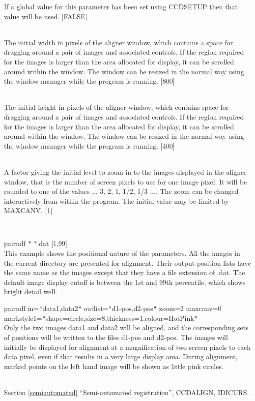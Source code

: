 \documentclass[twoside,11pt]{article}
\newcommand{\htmlref}[2]{#1}
\newcommand{\latexhtml}[2]{#1}
\renewcommand{\_}{\texttt{\symbol{95}}}
\newcommand{\xroutine}[1]{\htmlref{{\sc #1}}{#1}}
\newcommand{\secref}[2]{\latexhtml{Section \ref{#1} ``#2''}{``\htmlref{#2}{#1}''}}
\newcommand{\sstexamples}[1]{
   \item[Examples:] \mbox{} \\
   \vspace{-3.5ex}
   \begin{description}
      #1
   \end{description}
}
\newcommand{\sstsubsection}[1]{ \item[{#1}] \mbox{} \\}
\newcommand{\sstexamplesubsection}[2]{\sloppy \item{\ssttt #1} \mbox{} \\ #2 }
\newcommand{\sstnotes}[1]{\item[Notes:] \mbox{} \\[1.3ex] #1}
\newcommand{\sstdiytopic}[2]{\item[#1:] \mbox{} \\[1.3ex] #2}
\newcommand{\sstitemlist}[1]{
  \mbox{} \\
  \vspace{-3.5ex}
  \begin{itemize}
     #1
  \end{itemize}
}
\newcommand{\sstexamples}[1]{
      \item[Examples:] \\
      \begin{description}
         #1
      \end{description}
      \\
   }
\newcommand{\sstsubsection}[1]{\item[{#1}]}
\newcommand{\sstexamplesubsection}[2]{\item[{\ssttt #1}] #2}
\newcommand{\sstnotes}[1]{\item[Notes:] #1 }
\newcommand{\sstdiytopic}[2]{\item[{#1:}] #2 }
\newcommand{\sstitemlist}[1]{
      \begin{itemize}
         #1
      \end{itemize}
      \\
   }
\begin{document}
{{{         If a global value for this parameter has been set using
         \xroutine{CCDSETUP} then that value will be used.
         [FALSE]
      }
      \sstsubsection{
         WINX = \_INTEGER (Read and Write)
      }{
         The initial width in pixels of the aligner window, which contains
         a space for dragging around a pair of images and associated
         controls.  If the region required for the images is larger
         than the area allocated for display, it can be scrolled
         around within the window.  The window can be resized in the
         normal way using the window manager while the program is running.
         [800]
      }
      \sstsubsection{
         WINY = \_INTEGER (Read and Write)
      }{
         The initial height in pixels of the aligner window, which contains
         space for dragging around a pair of images and associated
         controls.  If the region required for the images is larger
         than the area allocated for display, it can be scrolled
         around within the window.  The window can be resized in the
         normal way using the window manager while the program is running.
         [400]
      }
      \sstsubsection{
         ZOOM = \_DOUBLE (Read and Write)
      }{
         A factor giving the initial level to zoom in to the images
         displayed in the aligner window, that is the number of screen
         pixels to use for one image pixel.  It will be rounded to one
         of the values ... 3, 2, 1, 1/2, 1/3 ....  The zoom can be
         changed interactively from within the program.  The initial
         value may be limited by MAXCANV.
         [1]
      }
   }
   \sstexamples{
      \sstexamplesubsection{
         pairndf $*$ $*$.dat [1,99]
      }{
         This example shows the positional nature of the parameters.
         All the images in the current directory are presented for
         alignment.  Their output position lists have the same name
         as the images except that they have a file extension of .dat.
         The default image display cutoff is between the 1st and 99th
         percentile, which shows bright detail well.
      }
      \sstexamplesubsection{
         pairndf in={\tt "}data1,data2{\tt "} outlist={\tt "}d1-pos,d2-pos{\tt "} zoom=2 maxcanv=0
              markstyle1={\tt "}shape=circle,size=8,thickness=1,colour=HotPink{\tt "}
      }{
         Only the two images data1 and data2 will be aligned, and the
         corresponding sets of positions will be written to the
         files d1-pos and d2-pos.  The images will initially be
         displayed for alignment at a magnification of two screen
         pixels to each data pixel, even if that results in a very
         large display area.  During alignment, marked points on the
         left hand image will be shown as little pink circles.
      }
   }
   \sstdiytopic{
      See also
   } {
      \secref{semiautomated}{Semi-automated registration},
      \xroutine{CCDALIGN}, 
      \xroutine{IDICURS}.
   }
   \sstnotes{
      \sstitemlist{

}}}
\end{document}
